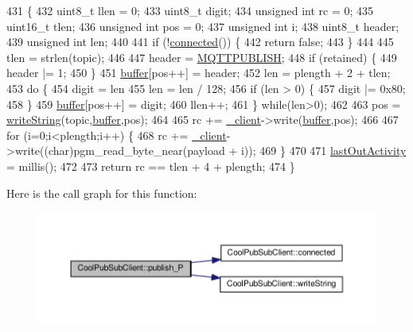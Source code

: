 \begin{DoxyCode}
431                                                                                                            
                \{
432     uint8\_t llen = 0;
433     uint8\_t digit;
434     \textcolor{keywordtype}{unsigned} \textcolor{keywordtype}{int} rc = 0;
435     uint16\_t tlen;
436     \textcolor{keywordtype}{unsigned} \textcolor{keywordtype}{int} pos = 0;
437     \textcolor{keywordtype}{unsigned} \textcolor{keywordtype}{int} i;
438     uint8\_t header;
439     \textcolor{keywordtype}{unsigned} \textcolor{keywordtype}{int} len;
440 
441     \textcolor{keywordflow}{if} (!\hyperlink{class_cool_pub_sub_client_a3d5a5da4ddb1e5c1bea64d80c665d148}{connected}()) \{
442         \textcolor{keywordflow}{return} \textcolor{keyword}{false};
443     \}
444 
445     tlen = strlen(topic);
446 
447     header = \hyperlink{_cool_pub_sub_client_8h_a673aa9dd952b13bf964449d67d21db85}{MQTTPUBLISH};
448     \textcolor{keywordflow}{if} (retained) \{
449         header |= 1;
450     \}
451     \hyperlink{class_cool_pub_sub_client_a7e8bcc6096626916046a51bebadc7851}{buffer}[pos++] = header;
452     len = plength + 2 + tlen;
453     \textcolor{keywordflow}{do} \{
454         digit = len %
455         len = len / 128;
456         \textcolor{keywordflow}{if} (len > 0) \{
457             digit |= 0x80;
458         \}
459         \hyperlink{class_cool_pub_sub_client_a7e8bcc6096626916046a51bebadc7851}{buffer}[pos++] = digit;
460         llen++;
461     \} \textcolor{keywordflow}{while}(len>0);
462 
463     pos = \hyperlink{class_cool_pub_sub_client_a0e3d7e776d4cf4427f9569b28868905a}{writeString}(topic,\hyperlink{class_cool_pub_sub_client_a7e8bcc6096626916046a51bebadc7851}{buffer},pos);
464 
465     rc += \hyperlink{class_cool_pub_sub_client_a487a65bafb6e3b8e9ab544b13a8878a0}{\_client}->write(\hyperlink{class_cool_pub_sub_client_a7e8bcc6096626916046a51bebadc7851}{buffer},pos);
466 
467     \textcolor{keywordflow}{for} (i=0;i<plength;i++) \{
468         rc += \hyperlink{class_cool_pub_sub_client_a487a65bafb6e3b8e9ab544b13a8878a0}{\_client}->write((\textcolor{keywordtype}{char})pgm\_read\_byte\_near(payload + i));
469     \}
470 
471     \hyperlink{class_cool_pub_sub_client_a8930f17c8a384f2e7600b5b854d67506}{lastOutActivity} = millis();
472 
473     \textcolor{keywordflow}{return} rc == tlen + 4 + plength;
474 \}
\end{DoxyCode}
Here is the call graph for this function\+:\nopagebreak
\begin{figure}[H]
\begin{center}
\leavevmode
\includegraphics[width=350pt]{d8/d4b/class_cool_pub_sub_client_a55458d47cf01f590e9b6647d5a418ab6_cgraph}
\end{center}
\end{figure}
